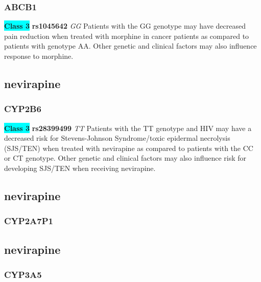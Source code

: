 \documentclass{book}
\begin{document}
\subsubsection{ ABCB1 }

\begin{center}
\textbf{\colorbox{cyan} {Class 3}} \textbf{ rs1045642 } \textit{ GG }
Patients with the GG genotype may have decreased pain reduction when treated with morphine in cancer patients as compared to patients with genotype AA. Other genetic and clinical factors may also influence response to morphine.


\end{center}\subsection{ nevirapine }


\subsubsection{ CYP2B6 }

\begin{center}
\textbf{\colorbox{cyan} {Class 3}} \textbf{ rs28399499 } \textit{ TT }
Patients with the TT genotype and HIV may have a decreased risk for Stevens-Johnson Syndrome/toxic epidermal necrolysis (SJS/TEN) when treated with nevirapine as compared to patients with the CC or CT genotype. Other genetic and clinical factors may also influence risk for developing SJS/TEN when receiving nevirapine.


\end{center}\subsection{ nevirapine }


\subsubsection{ CYP2A7P1 }

\begin{center}



\end{center}\subsection{ nevirapine }


\subsubsection{ CYP3A5 }
\end{document}
